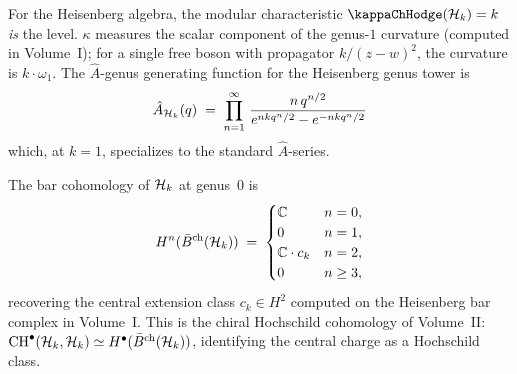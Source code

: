 \begin{remark}
\label{rem:rosetta-kappa-is-k}
For the Heisenberg algebra, the modular characteristic $\kappaChHodge(\cH_k) = k$ \emph{is} the level. $\kappa$ measures the scalar component of the genus-$1$ curvature (computed in Volume~I); for a single free boson with propagator $k/(z - w)^2$, the curvature is $k \cdot \omega_1$. The $\hat{A}$-genus generating function for the Heisenberg genus tower is
\begin{equation}\label{eq:rosetta-ahat}
\hat{A}_{\mathcal{H}_k}(q)
\;=\;
\prod_{n=1}^{\infty}\,
\frac{n\, q^{n/2}}{e^{n k q^n / 2} - e^{-n k q^n / 2}}
\end{equation}
which, at $k = 1$, specializes to the standard $\hat{A}$-series.
\end{remark}

\begin{proposition}
\label{prop:rosetta-bar-hochschild}
The bar cohomology of $\mathcal{H}_k$ at genus~$0$ is
\begin{equation}\label{eq:rosetta-bar-cohomology}
H^n(\bar{B}^{\mathrm{ch}}(\mathcal{H}_k))
\;=\;
\begin{cases}
\mathbb{C} & n = 0, \\
0 & n = 1, \\
\mathbb{C} \cdot c_k & n = 2, \\
0 & n \geq 3,
\end{cases}
\end{equation}
recovering the central extension class $c_k \in H^2$
computed on the Heisenberg bar complex in Volume~I.
This is the chiral Hochschild cohomology of Volume~II:
$\mathrm{CH}^{\bullet}(\mathcal{H}_k, \mathcal{H}_k) \simeq
H^{\bullet}(\bar{B}^{\mathrm{ch}}(\mathcal{H}_k))$, identifying the
central charge as a Hochschild class.
\end{proposition}

